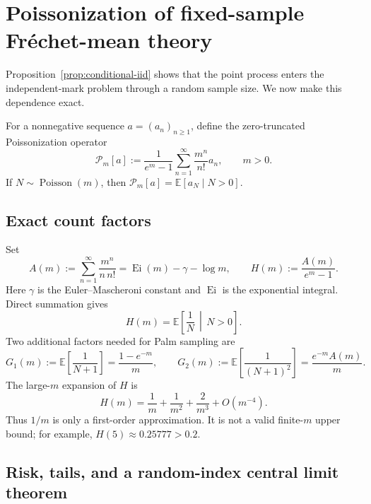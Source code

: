 \documentclass[11pt,a4paper]{article}
\theoremstyle{remark}
\newcommand{\EE}{\mathbb E}
\begin{document}
\section{Poissonization of fixed-sample Fr\'echet-mean theory}
\label{sec:poissonization}

Proposition~\ref{prop:conditional-iid} shows that the point process enters the independent-mark problem through a random sample size.  We now make this dependence exact.

For a nonnegative sequence \(a=(a_n)_{n\ge1}\), define the zero-truncated Poissonization operator
\begin{equation}
\label{eq:poissonization-operator}
 \mathscr P_m[a]
 :=\frac{1}{e^m-1}\sum_{n=1}^{\infty}\frac{m^n}{n!}a_n,
 \qquad m>0.
\end{equation}
If \(N\sim\operatorname{Poisson}(m)\), then \(\mathscr P_m[a]=\EE[a_N\mid N>0]\).

\subsection{Exact count factors}

Set
\begin{equation}
\label{eq:A-H-def}
 A(m):=\sum_{n=1}^{\infty}\frac{m^n}{n\,n!}
 =\operatorname{Ei}(m)-\gamma-\log m,
 \qquad
 H(m):=\frac{A(m)}{e^m-1}.
\end{equation}
Here \(\gamma\) is the Euler--Mascheroni constant and \(\operatorname{Ei}\) is the exponential integral.  Direct summation gives
\begin{equation}
\label{eq:H-expectation}
 H(m)=\EE\!\left[\frac1N\,\middle|\,N>0\right].
\end{equation}
Two additional factors needed for Palm sampling are
\begin{equation}
\label{eq:G1-G2}
 G_1(m):=\EE\!\left[\frac1{N+1}\right]=\frac{1-e^{-m}}{m},
 \qquad
 G_2(m):=\EE\!\left[\frac1{(N+1)^2}\right]=\frac{e^{-m}A(m)}{m}.
\end{equation}
The large-\(m\) expansion of \(H\) is
\begin{equation}
\label{eq:H-asymptotic}
 H(m)=\frac1m+\frac1{m^2}+\frac2{m^3}+O(m^{-4}).
\end{equation}
Thus \(1/m\) is only a first-order approximation.  It is not a valid finite-\(m\) upper bound; for example, \(H(5)\approx0.25777>0.2\).

\subsection{Risk, tails, and a random-index central limit theorem}
\end{document}
